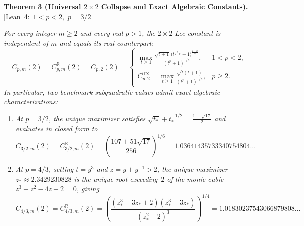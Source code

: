 \documentclass[10pt,letterpaper]{article}
\newcommand{\leanbadge}[1]{\mbox{\sffamily\scriptsize\color{leanborder}[#1]}}
\newcommand{\R}{\mathbb{R}}
\newcommand{\TZ}{\mathrm{TZ}}
\begin{document}
\begin{tcolorbox}[mathbox]
\textbf{Theorem 3 (Universal $2\times 2$ Collapse and Exact Algebraic Constants).}\hfill\leanbadge{Lean~4: $1<p<2$, $p=3/2$}\par\vspace{1.5pt}
\emph{For every integer $m \ge 2$ and every real $p > 1$, the $2\times 2$ Lee constant is independent of $m$ and equals its real counterpart:}
\[
  C_{p,m}(2) = C_{p,m}^{\R}(2) = C_{p,2}(2) =
  \begin{cases}
    \displaystyle \max_{t \ge 1}\frac{\sqrt{t+1}\,\bigl(t^{\frac{p}{2-p}} + 1\bigr)^{\frac{2-p}{2p}}}{(t^p + 1)^{1/p}}, & 1 < p < 2,\\[12pt]
    \displaystyle C_{p,2}^{\TZ} = \max_{t \ge 1}\frac{\sqrt{t(t+1)}}{(t^p + 1)^{1/p}}, & p \ge 2.
  \end{cases}
\]
\emph{In particular, two benchmark subquadratic values admit exact algebraic characterizations:}
\begin{enumerate}[leftmargin=1.6em,itemsep=2pt,topsep=3pt]
  \item \emph{At $p = 3/2$, the unique maximizer satisfies $\sqrt{t_*} + t_*^{-1/2} = \frac{1+\sqrt{17}}{2}$ and evaluates in closed form to}
  \[
    C_{3/2,m}(2) = C_{3/2,m}^{\R}(2) = \left(\frac{107 + 51\sqrt{17}}{256}\right)^{1/6} = 1.03641435733340754804\dots
  \]
  \item \emph{At $p = 4/3$, setting $t = y^3$ and $z = y + y^{-1} > 2$, the unique maximizer $z_* \approx 2.3429230828$ is the unique root exceeding~$2$ of the monic cubic $z^3 - z^2 - 4z + 2 = 0$, giving}
  \[
    C_{4/3,m}(2) = C_{4/3,m}^{\R}(2) = \left(\frac{(z_*^3 - 3z_* + 2)(z_*^3 - 3z_*)}{(z_*^2 - 2)^3}\right)^{1/4} = 1.01830237543066879808\dots
  \]
\end{enumerate}
\end{tcolorbox}
\end{document}
